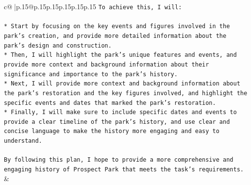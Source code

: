 \documentclass{article}
\begin{document}
{\begin{supertabular}{c@{$\;$}|p{.15\linewidth}@{}p{.15\linewidth}p{.15\linewidth}p{.15\linewidth}p{.15\linewidth}p{.15\linewidth}}
{{{\texttt{To achieve this, I will:} \\
\\ 
\texttt{* Start by focusing on the key events and figures involved in the park's creation, and provide more detailed information about the park's design and construction.} \\
\texttt{* Then, I will highlight the park's unique features and events, and provide more context and background information about their significance and importance to the park's history.} \\
\texttt{* Next, I will provide more context and background information about the park's restoration and the key figures involved, and highlight the specific events and dates that marked the park's restoration.} \\
\texttt{* Finally, I will make sure to include specific dates and events to provide a clear timeline of the park's history, and use clear and concise language to make the history more engaging and easy to understand.} \\
\\ 
\texttt{By following this plan, I hope to provide a more comprehensive and engaging history of Prospect Park that meets the task's requirements.} \\
            }
        }
    }
    & \\ \\

\end{supertabular}
}
\end{document}
